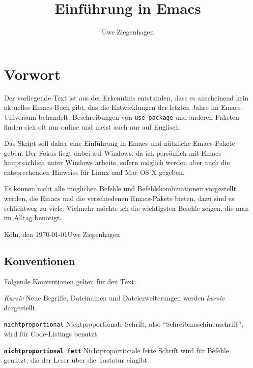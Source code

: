 \documentclass[12pt,ngerman]{scrbook}
\title{Einführung in Emacs}
\author{Uwe Ziegenhagen}
\begin{document}
\maketitle

\frontmatter

\tableofcontents

\listoffigures

\listoftables

\listoftodos

\chapter*{Vorwort}

Der vorliegende Text ist aus der Erkenntnis entstanden, dass es anscheinend kein aktuelles Emacs-Buch gibt, das die Entwicklungen der letzten Jahre im Emacs-Universum behandelt. 
Beschreibungen von \texttt{use-package} und anderen Paketen finden sich oft nur online und meist auch nur auf Englisch.

Das Skript soll daher eine Einführung in Emacs und nützliche Emacs-Pakete geben. 
Der Fokus liegt dabei auf Windows, da ich persönlich mit Emacs hauptsächlich unter Windows arbeite,  sofern möglich werden aber auch die entsprechenden Hinweise für Linux und Mac OS X gegeben. 

Es können nicht alle möglichen Befehle und Befehlskombinationen vorgestellt werden, die Emacs und die verschiedenen Emacs-Pakete bieten, dazu sind es schlichtweg zu viele. Vielmehr möchte ich die wichtigsten Befehle zeigen, die man im Alltag benötigt.

\vfill

Köln, den \today \hfill Uwe Ziegenhagen
\clearpage

\section*{Konventionen}

Folgende Konventionen gelten für den Text:

\textit{Kursiv} Neue Begriffe, Dateinamen und Dateierweiterungen werden \textit{kursiv} dargestellt.

\texttt{nichtproportional} Nichtproportionale Schrift, also \enquote{Schreibmaschinenschrift}, wird für Code-Listings benutzt.

\texttt{\bfseries nichtproportional fett} Nichtproportionale fette Schrift wird für Befehle genutzt, die der Leser über die Tastatur eingibt.
\end{document}
